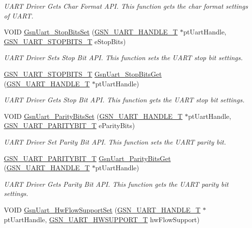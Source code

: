 \begin{DoxyCompactItemize}
\begin{DoxyCompactList}\small\item\em UART Driver Gets Char Format API. This function gets the char format settings of UART. \end{DoxyCompactList}\item 
VOID \hyperlink{a00656_gad9d35777aa29c641223dabe083698273}{GsnUart\_\-StopBitsSet} (\hyperlink{a00266}{GSN\_\-UART\_\-HANDLE\_\-T} $\ast$ptUartHandle, \hyperlink{a00656_gad24814e9f0d44d09137d1984c23155c1}{GSN\_\-UART\_\-STOPBITS\_\-T} eStopBits)
\begin{DoxyCompactList}\small\item\em UART Driver Sets Stop Bit API. This function sets the UART stop bit settings. \end{DoxyCompactList}\item 
\hyperlink{a00656_gad24814e9f0d44d09137d1984c23155c1}{GSN\_\-UART\_\-STOPBITS\_\-T} \hyperlink{a00656_gac23203e67a9128c9c651521afa29f530}{GsnUart\_\-StopBitsGet} (\hyperlink{a00266}{GSN\_\-UART\_\-HANDLE\_\-T} $\ast$ptUartHandle)
\begin{DoxyCompactList}\small\item\em UART Driver Gets Stop Bit API. This function gets the UART stop bit settings. \end{DoxyCompactList}\item 
VOID \hyperlink{a00656_gadb746c13dcdb711e624ce1e857bbb11e}{GsnUart\_\-ParityBitsSet} (\hyperlink{a00266}{GSN\_\-UART\_\-HANDLE\_\-T} $\ast$ptUartHandle, \hyperlink{a00656_ga62f12eb4660a18fb77ba09b0625d0c8e}{GSN\_\-UART\_\-PARITYBIT\_\-T} eParityBits)
\begin{DoxyCompactList}\small\item\em UART Driver Set Parity Bit API. This function sets the UART parity bit. \end{DoxyCompactList}\item 
\hyperlink{a00656_ga62f12eb4660a18fb77ba09b0625d0c8e}{GSN\_\-UART\_\-PARITYBIT\_\-T} \hyperlink{a00656_ga5215fd6a39e76e43f50c313952214b9b}{GsnUart\_\-ParityBitsGet} (\hyperlink{a00266}{GSN\_\-UART\_\-HANDLE\_\-T} $\ast$ptUartHandle)
\begin{DoxyCompactList}\small\item\em UART Driver Gets Parity Bit API. This function gets the UART parity bit settings. \end{DoxyCompactList}\item 
VOID \hyperlink{a00656_gae40916095a0f516326a0aa80efe47eac}{GsnUart\_\-HwFlowSupportSet} (\hyperlink{a00266}{GSN\_\-UART\_\-HANDLE\_\-T} $\ast$ptUartHandle, \hyperlink{a00656_gaf4df97392dfefed655a81fe500a74162}{GSN\_\-UART\_\-HWSUPPORT\_\-T} hwFlowSupport)

\end{DoxyCompactItemize}
